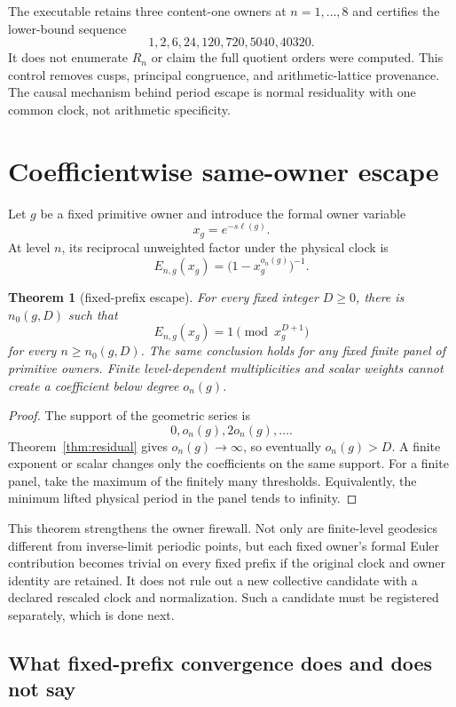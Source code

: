 \documentclass[11pt]{article}
\newtheorem{theorem}{Theorem}[section]
\theoremstyle{definition}
\theoremstyle{remark}
\begin{document}
The executable retains three content-one owners at $n=1,\ldots,8$ and certifies the lower-bound sequence
\[
1,2,6,24,120,720,5040,40320.
\]
It does not enumerate $R_n$ or claim the full quotient orders were computed. This control removes cusps, principal congruence, and arithmetic-lattice provenance. The causal mechanism behind period escape is normal residuality with one common clock, not arithmetic specificity.

\section{Coefficientwise same-owner escape}

Let $g$ be a fixed primitive owner and introduce the formal owner variable
\[
x_g=e^{-s\ell(g)}.
\]
At level $n$, its reciprocal unweighted factor under the physical clock is
\[
E_{n,g}(x_g)=\bigl(1-x_g^{o_n(g)}\bigr)^{-1}.
\]

\begin{theorem}[fixed-prefix escape]\label{thm:prefix}
For every fixed integer $D\geq0$, there is $n_0(g,D)$ such that
\[
E_{n,g}(x_g)=1\pmod{x_g^{D+1}}
\]
for every $n\geq n_0(g,D)$. The same conclusion holds for any fixed finite panel of primitive owners. Finite level-dependent multiplicities and scalar weights cannot create a coefficient below degree $o_n(g)$.
\end{theorem}

\begin{proof}
The support of the geometric series is
\[
0,o_n(g),2o_n(g),\ldots.
\]
Theorem~\ref{thm:residual} gives $o_n(g)\to\infty$, so eventually $o_n(g)>D$. A finite exponent or scalar changes only the coefficients on the same support. For a finite panel, take the maximum of the finitely many thresholds. Equivalently, the minimum lifted physical period in the panel tends to infinity.
\end{proof}

This theorem strengthens the owner firewall. Not only are finite-level geodesics different from inverse-limit periodic points, but each fixed owner's formal Euler contribution becomes trivial on every fixed prefix if the original clock and owner identity are retained. It does not rule out a new collective candidate with a declared rescaled clock and normalization. Such a candidate must be registered separately, which is done next.

\subsection{What fixed-prefix convergence does and does not say}
\end{document}
